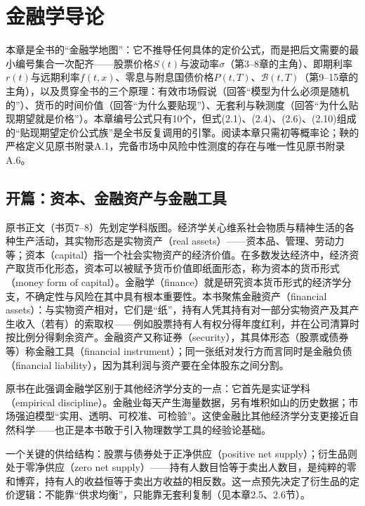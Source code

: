 \chapter{金融学导论}

本章是全书的“金融学地图”：它不推导任何具体的定价公式，而是把后文需要的最小编号集合一次配齐——股票价格$S(t)$与波动率$\sigma$（第3--8章的主角）、即期利率$r(t)$与远期利率$f(t,x)$、零息与附息国债价格$P(t,T)$、$\mathcal{B}(t,T)$（第9--15章的主角），以及贯穿全书的三个原理：有效市场假说（回答“模型为什么必须是随机的”）、货币的时间价值（回答“为什么要贴现”）、无套利与鞅测度（回答“为什么贴现期望就是价格”）。本章编号公式只有10个，但式(2.1)、(2.4)、(2.6)、(2.10)组成的“贴现期望定价公式族”是全书反复调用的引擎。阅读本章只需初等概率论；鞅的严格定义见原书附录A.1，完备市场中风险中性测度的存在与唯一性见原书附录A.6。

\section*{开篇：资本、金融资产与金融工具}

原书正文（书页7--8）先划定学科版图。经济学关心维系社会物质与精神生活的各种生产活动，其实物形态是实物资产（real assets）——资本品、管理、劳动力等；资本（capital）指一个社会实物资产的经济价值。在多数发达经济中，经济资产取货币化形态，资本可以被赋予货币价值即纸面形态，称为资本的货币形式（money form of capital）。金融学（finance）就是研究资本货币形式的经济学分支，不确定性与风险在其中具有根本重要性。本书聚焦金融资产（financial assets）：与实物资产相对，它们是“纸”，持有人凭其持有对一部分实物资产及其产生收入（若有）的索取权——例如股票持有人有权分得年度红利，并在公司清算时按比例分得剩余资产。金融资产又称证券（security），其具体形态（股票或债券等）称金融工具（financial instrument）；同一张纸对发行方而言同时是金融负债（financial liability），因为其利润与资产要在全体股东之间分割。

原书在此强调金融学区别于其他经济学分支的一点：它首先是实证学科（empirical discipline）。金融业每天产生海量数据，另有堆积如山的历史数据；市场强迫模型“实用、透明、可校准、可检验”。这使金融比其他经济学分支更接近自然科学——也正是本书敢于引入物理数学工具的经验论基础。

一个关键的供给结构：股票与债券处于正净供应（positive net supply）；衍生品则处于零净供应（zero net supply）——持有人数目恰等于卖出人数目，是纯粹的零和博弈，持有人的收益恒等于卖出方收益的相反数。这一点预先决定了衍生品的定价逻辑：不能靠“供求均衡”，只能靠无套利复制（见本章2.5、2.6节）。

